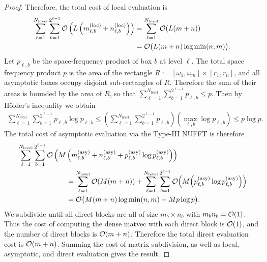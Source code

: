 \begin{proof}
    Therefore, the total cost of local evaluation is 
    \begin{align}
        \sum_{\ell=1}^{N_{\text{level}}} \sum_{b=1}^{2^{\ell-1}} \mathcal{O}\left(L\left(m_{\ell,b}^{(\text{loc})} + n_{\ell,b}^{(\text{loc})}\right)\right)
        &= \sum_{\ell=1}^{N_{\text{level}}} \mathcal{O}(L(m + n)) \\
        &= \mathcal{O}\big(L (m + n) \log \min(n,m)\big).
    \end{align}
    Let $p_{\ell,b}$ be the space-frequency product of box $b$ at level $\ell$.
    The total space frequency product $p$ is the area of the rectangle $R :=
    [\omega_1, \omega_m] \times [r_1, r_n]$, and all asymptotic boxes occupy
    disjoint sub-rectangles of $R$. Therefore the sum of their areas is bounded
    by the area of $R$, so that $\sum_{\ell=1}^{N_{\text{level}}}
    \sum_{b=1}^{2^{\ell-1}} p_{\ell,b} \leq p$. Then by H\"older's inequality we
    obtain 
    \begin{align} 
        \sum_{\ell=1}^{N_{\text{level}}} \sum_{b=1}^{2^{\ell-1}} p_{\ell,b} \log p_{\ell,b}
        \leq \left( \sum_{\ell=1}^{N_{\text{level}}} \sum_{b=1}^{2^{\ell-1}} p_{\ell,b} \right) \left(\max_{\ell,b} \log p_{\ell,b} \right) 
        \leq p \log p.
    \end{align}
    The total cost of asymptotic evaluation via the Type-III NUFFT is therefore
    \begin{align}
        & \sum_{\ell=1}^{N_{\text{level}}} \sum_{b=1}^{2^{\ell-1}} \bO\left(M\left(m_{\ell,b}^{(\text{asy})} + n_{\ell,b}^{(\text{asy})} + p_{\ell,b}^{(\text{asy})} \log p_{\ell,b}^{(\text{asy})} \right)\right) \\
        &\hspace*{0.2\textwidth} = \sum_{\ell=1}^{N_{\text{level}}} \bO(M(m + n)) + \sum_{\ell=1}^{N_{\text{level}}} \sum_{b=1}^{2^{\ell-1}} \bO\Big(M\Big(p_{\ell,b}^{(\text{asy})} \log p_{\ell,b}^{(\text{asy})}\Big)\Big) \\
        &\hspace*{0.2\textwidth} = \bO\big(M (m + n) \log \min(n,m) + Mp\log p\big).
    \end{align}
    We subdivide until all direct blocks are all of size $m_b \times n_b$ with
    $m_bn_b = \mathcal{O}(1)$. Thus the cost of computing the dense matvec with each
    direct block is $\mathcal{O}(1)$, and the number of direct blocks is $\mathcal{O}(m + n)$.
    Therefore the total direct evaluation cost is $\mathcal{O}(m + n)$. Summing the cost
    of matrix subdivision, as well as local, asymptotic, and direct evaluation gives the result.
\end{proof}

